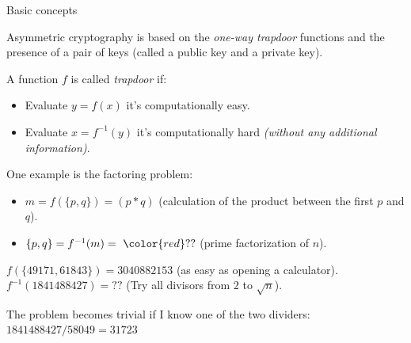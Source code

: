 \documentclass[handout, xcolor=dvipsnames,aspectratio=169]{beamer}
\begin{document}
\begin{frame}{Basic concepts}

  Asymmetric cryptography is based on the \textit{one-way trapdoor} functions and the presence of a pair of keys (called a public key and a private key).

  \pause

  \medskip

  A function $f$ is called \textit{trapdoor} if:
  \begin{itemize}
    \item Evaluate $y = f(x)$ it's computationally easy.
    \item Evaluate $x = f^{-1}(y)$ it's computationally hard \textit{(without any additional information)}.
  \end{itemize}

  \pause

  \smallskip

  One example is the factoring problem:
  \begin{itemize}
    \item $m = f(\{p, q\}) = (p * q)$ (calculation of the product between the first $p$ and $q$).
    \item $\{p, q\} = f^{-1}(m) =\ {\color{red}??} $ (prime factorization of $n$).
  \end{itemize}

  \smallskip

  \pause

  $f(\{49171, 61843\}) = 3040882153$ (as easy as opening a calculator).
  $f^{-1}(1841488427) = ??$ (Try all divisors from $2$ to $\sqrt{n}$).

  \pause

  The problem becomes trivial if I know one of the two dividers:
  $1841488427 / 58049 = 31723$

\end{frame}
\end{document}
